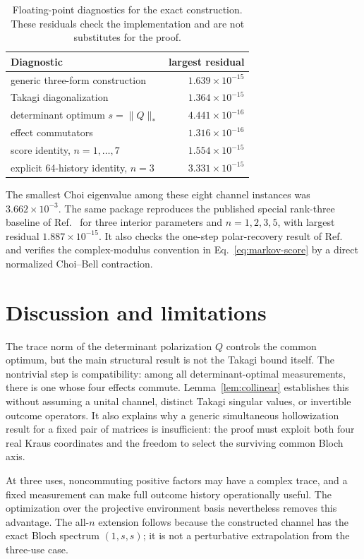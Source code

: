 \documentclass[11pt]{article}
\theoremstyle{remark}
\begin{document}
\begin{table}[ht]
\centering
\caption{Floating-point diagnostics for the exact construction.  These
residuals check the implementation and are not substitutes for the proof.}
\label{tab:checks}
\begin{tabular}{lr}
\toprule
Diagnostic & largest residual \\
\midrule
generic three-form construction & $1.639\times10^{-15}$ \\
Takagi diagonalization & $1.364\times10^{-15}$ \\
determinant optimum $s=\|Q\|_*$ & $4.441\times10^{-16}$ \\
effect commutators & $1.316\times10^{-16}$ \\
score identity, $n=1,\ldots,7$ & $1.554\times10^{-15}$ \\
explicit 64-history identity, $n=3$ & $3.331\times10^{-15}$ \\
\bottomrule
\end{tabular}
\end{table}

The smallest Choi eigenvalue among these eight channel instances was
$3.662\times10^{-3}$.  The same package reproduces the published special
rank-three baseline of Ref.~\cite{rexiti2024} for three interior parameters
and $n=1,2,3,5$, with largest residual $1.887\times10^{-15}$.  It also checks
the one-step polar-recovery result of Ref.~\cite{gregoratti2004} and verifies
the complex-modulus convention in Eq.~\eqref{eq:markov-score} by a direct
normalized Choi--Bell contraction.

\section{Discussion and limitations}
\label{sec:discussion}

The trace norm of the determinant polarization $Q$ controls the common
optimum, but the main structural result is not the Takagi bound itself.  The
nontrivial step is compatibility: among all determinant-optimal measurements,
there is one whose four effects commute.  Lemma~\ref{lem:collinear} establishes
this without assuming a unital channel, distinct Takagi singular values, or
invertible outcome operators.  It also explains why a generic simultaneous
hollowization result for a fixed pair of matrices is insufficient: the proof
must exploit both four real Kraus coordinates and the freedom to select the
surviving common Bloch axis.

At three uses, noncommuting positive factors may have a complex trace, and a
fixed measurement can make full outcome history operationally useful.  The
optimization over the projective environment basis nevertheless removes this
advantage.  The all-$n$ extension follows because the constructed channel has
the exact Bloch spectrum $(1,s,s)$; it is not a perturbative extrapolation from
the three-use case.
\end{document}

